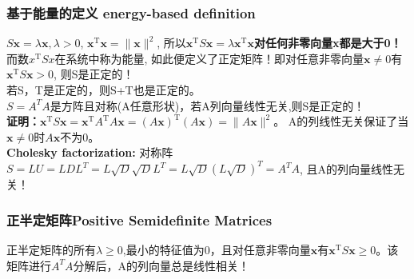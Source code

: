 \documentclass[UTF8]{article}
\begin{document}
    \subsubsection{基于能量的定义 energy-based definition}
    $S \boldsymbol{x}=\lambda \boldsymbol{x}, \lambda >0$, $\boldsymbol{x}^{\mathrm{T}} \boldsymbol{x}=\|\boldsymbol{x}\|^{2}$, 所以$\boldsymbol{x}^{\mathrm{T}} S \boldsymbol{x}=\lambda \boldsymbol{x}^{\mathrm{T}} \boldsymbol{x}$\textbf{对任何非零向量x都是大于0！}
    \\
    而数$x^{\mathrm{T}} S x$在系统中称为能量, 如此便定义了正定矩阵！即对任意非零向量$\bm{x}\neq 0$有$\bm{x}^{\mathrm{T}} S \bm{x}>0$, 则S是正定的！
    \\
    若S，T是正定的，则S+T也是正定的。\\
    $S=A^{T}A$是方阵且对称(A任意形状)，若A列向量线性无关,则S是正定的！\\
    \textbf{证明：}$\bm{x}^{\mathrm{T}} S \bm{x}= \boldsymbol{x}^{\mathrm{T}} A^{\mathrm{T}} A \bm{x} =(A \boldsymbol{x})^{\mathrm{T}}(A \boldsymbol{x})=\|A \boldsymbol{x}\|^{2}$。
    A的列线性无关保证了当$\bm{x} \neq 0$时$A \boldsymbol{x}$不为0。\\
    \textbf{Cholesky factorization:} 对称阵$S=LU=LDL^{T}=L\sqrt{D} \sqrt{D}L^{T}=L\sqrt{D} (L \sqrt{D})^{T}=A^{T}A $, 且A的列向量线性无关！

    \subsubsection{正半定矩阵Positive Semidefinite Matrices}
    正半定矩阵的所有$\lambda \geq 0$,最小的特征值为0，且对任意非零向量$\bm{x}$有$\boldsymbol{x}^{\mathrm{T}} S \boldsymbol{x} \geq 0$。该矩阵进行$A^{T}A$分解后，A的列向量总是线性相关！
\end{document}
